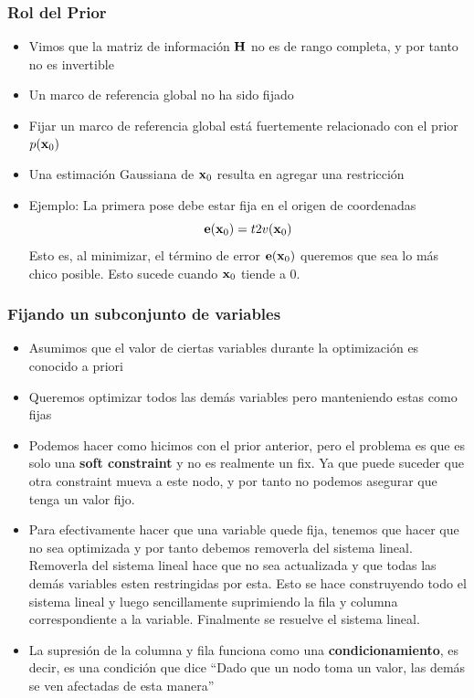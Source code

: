 \begin{frame}
    \frametitle{Rol del Prior}
    
    \begin{itemize}
        \item Vimos que la matriz de información $\boldsymbol{\mathbf{H}}$ no es de rango completa, y por tanto no es invertible
        \item Un marco de referencia global no ha sido fijado
        \item Fijar un marco de referencia global está fuertemente relacionado con el prior $p(\boldsymbol{\mathbf{x}}_{0})$
        \item Una estimación Gaussiana de $\boldsymbol{\mathbf{x}}_{0}$ resulta en agregar una restricción
        \item Ejemplo: La primera pose debe estar fija en el origen de coordenadas
        \begin{equation*}
            \boldsymbol{\mathbf{e}}(\boldsymbol{\mathbf{x}}_{0}) = t2v(\boldsymbol{\mathbf{x}}_{0})
        \end{equation*}
        Esto es, al minimizar, el término de error $\boldsymbol{\mathbf{e}}(\boldsymbol{\mathbf{x}}_{0})$ queremos que sea lo más chico posible. Esto sucede cuando $\boldsymbol{\mathbf{x}}_{0}$ tiende a 0.
    \end{itemize}
    
\end{frame}

\begin{frame}
    \frametitle{Fijando un subconjunto de variables}
    
    \begin{itemize}
        \item Asumimos que el valor de ciertas variables durante la optimización es conocido a priori
        \item Queremos optimizar todos las demás variables pero manteniendo estas como fijas
        \item Podemos hacer como hicimos con el prior anterior, pero el problema es que es solo una {\bf soft constraint} y no es realmente un fix. Ya que puede suceder que otra constraint mueva a este nodo, y por tanto no podemos asegurar que tenga un valor fijo.
        \item Para efectivamente hacer que una variable quede fija, tenemos que hacer que no sea optimizada y por tanto debemos removerla del sistema lineal. Removerla del sistema lineal hace que no sea actualizada y que todas las demás variables esten restringidas por esta. Esto se hace construyendo todo el sistema lineal y luego sencillamente suprimiendo la fila y columna correspondiente a la variable. Finalmente se resuelve el sistema lineal.
        \item La supresión de la columna y fila funciona como una {\bf condicionamiento}, es decir, es una condición que dice ``Dado que un nodo toma un valor, las demás se ven afectadas de esta manera''
        
    \end{itemize}
    
\end{frame}

